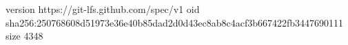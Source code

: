 version https://git-lfs.github.com/spec/v1
oid sha256:250768608d51973e36e40b85dad2d0d43ec8ab8c4acf3b667422fb3447690111
size 4348
